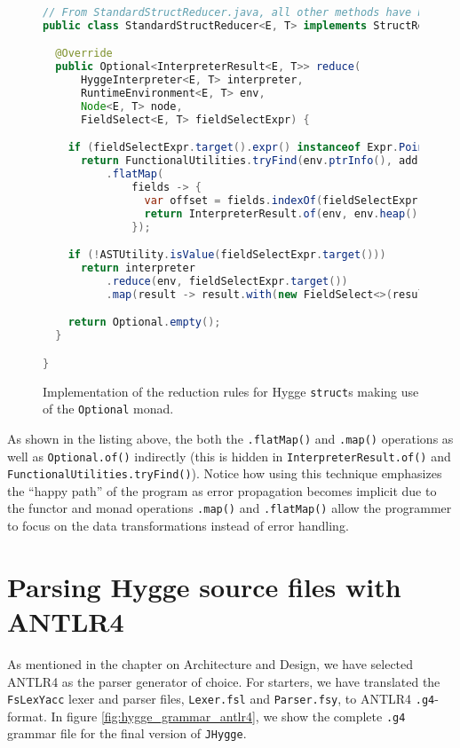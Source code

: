\begin{figure}[H]
\centering  
\begin{lstlisting}[language=Java]
// From StandardStructReducer.java, all other methods have been redacted ...
public class StandardStructReducer<E, T> implements StructReducer<E, T> {

  @Override
  public Optional<InterpreterResult<E, T>> reduce(
      HyggeInterpreter<E, T> interpreter,
      RuntimeEnvironment<E, T> env,
      Node<E, T> node,
      FieldSelect<E, T> fieldSelectExpr) {

    if (fieldSelectExpr.target().expr() instanceof Expr.Pointer<E, T>(int address))
      return FunctionalUtilities.tryFind(env.ptrInfo(), address)
          .flatMap(
              fields -> {
                var offset = fields.indexOf(fieldSelectExpr.field());
                return InterpreterResult.of(env, env.heap().get(address + offset));
              });

    if (!ASTUtility.isValue(fieldSelectExpr.target()))
      return interpreter
          .reduce(env, fieldSelectExpr.target())
          .map(result -> result.with(new FieldSelect<>(result.node(), fieldSelectExpr.field())));

    return Optional.empty();
  }

}
\end{lstlisting}
\caption{Implementation of the reduction rules for Hygge \texttt{struct}s making use of the \texttt{Optional} monad.}
\label{fig:struct_reducer_monads}
\end{figure}

As shown in the listing above, the both the \texttt{.flatMap()} and \texttt{.map()} operations as well as \texttt{Optional.of()}
indirectly (this is hidden in \texttt{InterpreterResult.of()} and \texttt{FunctionalUtilities.tryFind()}). Notice how using
this technique emphasizes the ``happy path'' of the program as error propagation becomes implicit due to the functor and monad
operations \texttt{.map()} and \texttt{.flatMap()} allow the programmer to focus on the data transformations instead of error
handling.

\section{Parsing Hygge source files with ANTLR4}

As mentioned in the chapter on Architecture and Design, we have selected ANTLR4 as the parser generator of choice. For starters,
we have translated the \texttt{FsLexYacc} lexer and parser files, \texttt{Lexer.fsl} and \texttt{Parser.fsy}, to ANTLR4
\texttt{.g4}-format. In figure \ref{fig:hygge_grammar_antlr4}, we show the complete \texttt{.g4} grammar file for the final version of \texttt{JHygge}.

